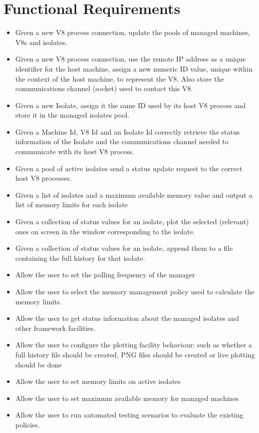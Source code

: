 \documentclass{l4proj}
\begin{document}
\section{Functional Requirements}
\begin{itemize}
\item Given a new V8 process connection, update the pools of managed machines, V8s and isolates.
\item Given a new V8 process connection, use the remote IP address as a unique identifier for the host machine, assign a new numeric ID value, unique within the context of the host machine, to represent the V8. Also store the communications channel (socket) used to contact this V8.
\item Given a new Isolate, assign it the same ID used by its host V8 process and store it in the managed isolates pool.
\item Given a Machine Id, V8 Id and an Isolate Id correctly retrieve the status information of the Isolate and the communications channel needed to communicate with its host V8 process.
\item Given a pool of active isolates send a status update request to the correct host V8 processes. 
\item Given a list of isolates and a maximum available memory value and output a list of memory limits for each isolate
\item Given a collection of status values for an isolate, plot the selected (relevant) ones on screen in the window corresponding to the isolate.
\item Given a collection of status values for an isolate, append them to a file containing the full history for that isolate.
\item Allow the user to set the polling frequency of the manager
\item Allow the user to select the memory management policy used to calculate the memory limits.
\item Allow the user to get status information about the managed isolates and other framework facilities.
\item Allow the user to configure the plotting facility behaviour: such as whether a full history file should be created, PNG files should be created or live plotting should be done
\item Allow the user to set memory limits on active isolates
\item Allow the user to set maximum available memory for managed machines
\item Allow the user to run automated testing scenarios to evaluate the existing policies.
\end{itemize}
\newpage
\end{document}
